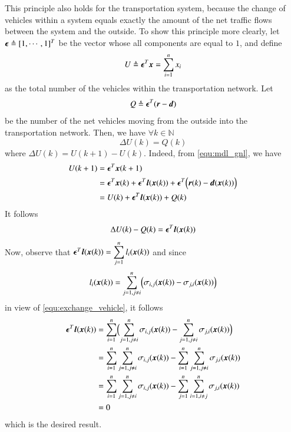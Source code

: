 \documentclass[preprint,authoryear,12pt]{elsarticle}
\renewcommand{\vec}[1]{\mbox{\boldmath$#1$}}
\begin{document}
This principle also holds for the transportation system, because the
change of vehicles within a system equals exactly the amount of the
net traffic flows between the system and the outside. To show this
principle more clearly, 
let $\vec{\epsilon} \triangleq [1,\cdots,1]^T$ be the vector whose
all components are equal to $1$, and define
\begin{equation}\label{equ:total_vehicle}
U \triangleq \vec{\epsilon}^T\vec{x}=\sum_{i=1}^n x_i
\end{equation}
as the total number of the vehicles within the transportation
network. Let
\begin{equation}\label{equ:all_io}
Q \triangleq \vec{\epsilon}^T(\vec{r}-\vec{d})
\end{equation}
be the number of the net vehicles moving from the outside into the
transportation network. Then, we have $\forall k\in\mathbb{N}$
\begin{equation}\label{equ:conservation}
\Delta U(k) = Q(k)
\end{equation}
where $\Delta U(k)=U(k+1)-U(k)$.
Indeed, from \eqref{equ:mdl_gnl}, we have
\begin{align*}
U(k+1) &= \vec{\epsilon}^T\vec{x}(k+1)\\
       &=
\vec{\epsilon}^T\vec{x}(k)+\vec{\epsilon}^T\vec{l}(\vec{x}(k))
+\vec{\epsilon}^T\Bigl(\vec{r}(k)-\vec{d}(\vec{x}(k))\Bigr)\\
       &= U(k)+\vec{\epsilon}^T\vec{l}(\vec{x}(k))+Q(k)
\end{align*}
It follows
$$\Delta U(k)-Q(k) = \vec{\epsilon}^T\vec{l}(\vec{x}(k))$$
Now, observe that $\vec{\epsilon}^T\vec{l}(\vec{x}(k)) =\displaystyle
\sum_{j=1}^{n} l_i(\vec{x}(k))$ and since 
$$l_i(\vec{x}(k))=\displaystyle\sum_{j=1,j\neq
i}^{n}\Bigl(\sigma_{i,j}(\vec{x}(k))-\sigma_{j,i}(\vec{x}(k))\Bigr)$$
 in view of
\eqref{equ:exchange_vehicle}, it follows
\begin{align*}
\vec{\epsilon}^T\vec{l}(\vec{x}(k))
    &= \sum_{i=1}^n \Bigl(\sum_{j=1,j\neq i}^{n} \sigma_{i,j}(\vec{x}(k))
       -\sum_{j=1,j\neq i}^{n} \sigma_{j,i}(\vec{x}(k))\Bigr)\\
    &= \sum_{i=1}^n \sum_{j=1,j\neq i}^{n} \sigma_{i,j}(\vec{x}(k))
       -\sum_{i=1}^n \sum_{j=1,j\neq i}^{n} \sigma_{j,i}(\vec{x}(k))\\
    &= \sum_{i=1}^n \sum_{j=1,j\neq i}^{n} \sigma_{i,j}(\vec{x}(k))
       -\sum_{j=1}^n \sum_{i=1,i\neq j}^{n} \sigma_{j,i}(\vec{x}(k))\\
    &= 0
\end{align*}
which is the desired result.
\end{document}
